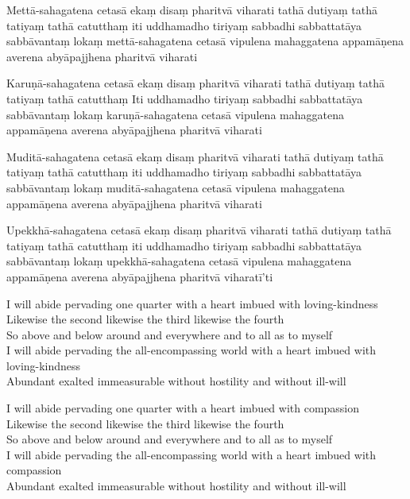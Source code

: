 \begin{leader}
\end{leader}

Mettā-sahagatena cetasā ekaṃ disaṃ pharitvā viharati tathā dutiyaṃ tathā tatiyaṃ tathā catutthaṃ iti uddhamadho tiriyaṃ sabbadhi sabbattatāya sabbāvantaṃ lokaṃ mettā-sahagatena cetasā vipulena mahaggatena appamāṇena averena abyāpajjhena pharitvā viharati

Karuṇā-sahagatena cetasā ekaṃ disaṃ pharitvā viharati tathā dutiyaṃ tathā tatiyaṃ tathā catutthaṃ
Iti uddhamadho tiriyaṃ sabbadhi sabbattatāya sabbāvantaṃ lokaṃ karuṇā-sahagatena cetasā vipulena mahaggatena appamāṇena averena abyāpajjhena pharitvā viharati

Muditā-sahagatena cetasā ekaṃ disaṃ pharitvā viharati tathā dutiyaṃ tathā tatiyaṃ tathā catutthaṃ iti uddhamadho tiriyaṃ sabbadhi sabbattatāya sabbāvantaṃ lokaṃ muditā-sahagatena cetasā vipulena mahaggatena appamāṇena averena abyāpajjhena pharitvā viharati

Upekkhā-sahagatena cetasā ekaṃ disaṃ pharitvā viharati tathā dutiyaṃ tathā tatiyaṃ tathā catutthaṃ iti uddhamadho tiriyaṃ sabbadhi sabbattatāya sabbāvantaṃ lokaṃ upekkhā-sahagatena cetasā vipulena mahaggatena appamāṇena averena abyāpajjhena pharitvā viharatī'ti

\begin{leader}
\end{leader}

I will abide pervading one quarter with a heart imbued with loving-kindness\\
Likewise the second likewise the third likewise the fourth\\
So above and below around and everywhere and to all as to myself\\
I will abide pervading the all-encompassing world with a heart imbued with loving-kindness\\
Abundant exalted immeasurable without hostility and without ill-will

I will abide pervading one quarter with a heart imbued with compassion\\
Likewise the second likewise the third likewise the fourth\\
So above and below around and everywhere and to all as to myself\\
I will abide pervading the all-encompassing world with a heart imbued with compassion\\
Abundant exalted immeasurable without hostility and without ill-will

